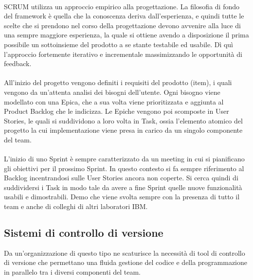 \paragraph{}
SCRUM utilizza un approccio empirico alla progettazione. La filosofia di fondo del framework è quella che la conoscenza deriva dall'esperienza, e quindi tutte le scelte che si prendono nel corso della progettazione devono avvenire alla luce di una sempre maggiore esperienza, la quale si ottiene avendo a disposizione il prima possibile un sottoinsieme del prodotto a se stante testabile ed usabile. Dì quì l'approccio fortemente iterativo e incrementale massimizzando le opportunità di feedback. 
\paragraph{} 
All'inizio del progetto vengono definiti i requisiti del prodotto (item), i quali vengono da un'attenta analisi dei bisogni dell'utente. Ogni bisogno viene modellato con una Epica, che a sua volta viene prioritizzata e aggiunta al Product Backlog che le indicizza. Le Epiche vengono poi scomposte in User Stories, le quali si suddividono a loro volta in Task, ossia l'elemento atomico del progetto la cui implementazione viene presa in carico da un singolo componente del team.
\paragraph{}
L'inizio di uno Sprint è sempre caratterizzato da un meeting in cui si pianificano gli obiettivi per il prossimo Sprint. In questo contesto si fa sempre riferimento al Backlog incentrandosi sulle User Stories ancora non coperte. Si cerca quindi di suddividersi i Task in modo tale da avere a fine Sprint quelle nuove funzionalità usabili e dimostrabili. Demo che viene svolta sempre con la presenza di tutto il team e anche di colleghi di altri laboratori IBM.
\subsection{Sistemi di controllo di versione}
Da un'organizzazione di questo tipo ne scaturisce la necessità di tool di controllo di versione che permettano una fluida gestione del codice e della programmazione in parallelo tra i diversi componenti del team.
